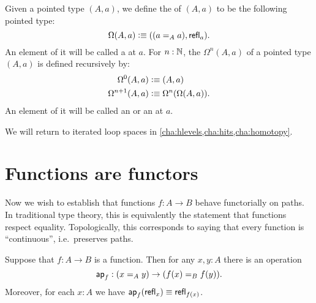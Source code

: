 \begin{defn} \label{def:loopspace}
  Given a pointed type $(A,a)$, we define the 
  of $(A,a)$ to be the following pointed type:
  \[\Omega(A,a)\defeq ((\id[A]aa),\refl a).\]
  An element of it will be called a  at $a$.
  For $n:\N$, the  $\Omega^{n}(A,a)$
  of a pointed type $(A,a)$ is defined recursively by:
  \begin{align*}
    \Omega^0(A,a)&\defeq(A,a)\\
    \Omega^{n+1}(A,a)&\defeq\Omega^n(\Omega(A,a)).
  \end{align*}
  An element of it will be called an 
  or an 
  at $a$.
\end{defn}

We will return to iterated loop spaces in \cref{cha:hlevels,cha:hits,cha:homotopy}.
%
%

\section{Functions are functors}
\label{sec:functors}

%
%
Now we wish to establish that functions $f:A\to B$ behave functorially on paths.
In traditional type theory, this is equivalently the statement that functions respect equality.
%
Topologically, this corresponds to saying that every function is ``continuous'', i.e.\ preserves paths.

\begin{lem}\label{lem:map}
  Suppose that $f:A\to B$ is a function.
  Then for any $x,y:A$ there is an operation
  \begin{equation*}
    \apfunc f : (\id[A] x y) \to (\id[B] {f(x)} {f(y)}).
  \end{equation*}
  Moreover, for each $x:A$ we have $\apfunc{f}(\refl{x})\jdeq \refl{f(x)}$.
\end{lem}

